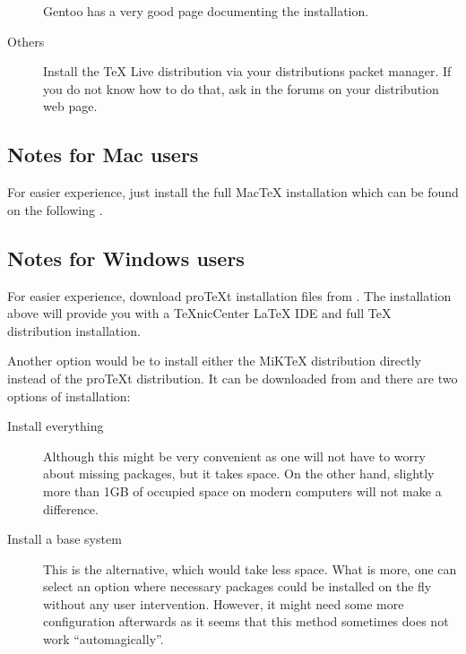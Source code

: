 \documentclass[
    draft
]{scrartcl}
\newcommand{\MiKTeX}{MiK\TeX}
\newcommand{\MacTeX}{Mac\TeX}
\begin{document}
\begin{description}
        Gentoo has a very good
        page documenting the installation.
    \item[Others]
        Install the \TeX{} Live distribution via your distributions packet
        manager. If you do not know how to do that, ask in the forums on your
        distribution web page.
\end{description}

\subsection{Notes for Mac users}

For easier experience, just install the full \MacTeX{} installation which can be
found on the following .

\subsection{Notes for Windows users}

%
For easier experience, download pro\TeX{}t installation files from
    .
%
The installation above will provide you with a \TeX{}nicCenter \LaTeX{} IDE and
    full \TeX{} distribution installation.

%
Another option would be to install either the \MiKTeX{} distribution directly
    instead of the pro\TeX{}t distribution.
%
It can be downloaded from 
    and there are two options of installation:
\begin{description}
    \item[Install everything] 
        Although this might be very convenient as
            one will not have to worry about missing packages, but it takes
            space.
        On the other hand, slightly more than 1GB of occupied space on modern
            computers will not make a difference.
    \item[Install a base system] 
        This is the alternative, which would take less
            space. 
        What is more, one can select an option where necessary packages
            could be installed on the fly without any user intervention.
        However, it might need some more configuration afterwards as it seems
            that this method sometimes does not work ``automagically''.
\end{description}
\end{document}
